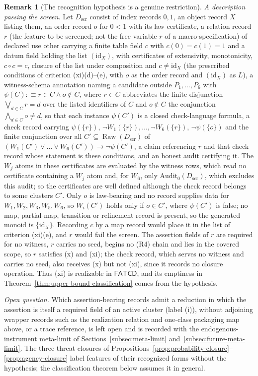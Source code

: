 \documentclass[11pt]{article}
\theoremstyle{definition}
\newtheorem{remark}[theorem]{Remark}
\newcommand{\FATCD}{\ensuremath{\mathsf{FATCD}}}
\newcommand{\Raw}[1]{\ensuremath{\operatorname{Raw}\!\left(#1\right)}}
\begin{document}
\begin{remark}[The recognition hypothesis is a genuine restriction]
\emph{A description passing the screen.} Let \(D_{\mathrm{scr}}\) consist of
index records \(0,1\), an object record \(X\) listing them, an order record \(o\) for
\(0<1\) with its law certificate, a relation record \(r\) (the feature to be screened; not the free variable \(r\) of a macro-specification) of declared use
other carrying a finite table field \(c\) with \(c(0)=c(1)=1\) and a datum field
holding the list \((\mathrm{id}_X)\), with
certificates of extensivity, monotonicity, \(c\circ c=c\), closure of the list
under composition and \(c\ne\mathrm{id}_X\) (the prescribed conditions of criterion (xi)(d)--(e), with \(o\) as the order record and \((\mathrm{id}_X)\) as \(L\)), a witness-schema annotation naming a
candidate outside \(P_1,\dots,P_6\) with \(\psi(C):\equiv r\in C\wedge o\notin
C\), where \(r\in C\) abbreviates the finite disjunction \(\bigvee_{d\in C}r=d\)
over the listed identifiers of \(C\) and \(o\notin C\) the conjunction
\(\bigwedge_{d\in C}o\neq d\), so that each instance \(\psi(C')\) is a closed
check-language formula, a check record carrying \(\psi(\{r\})\), \(\neg W_1(\{r\}),\dots,\neg
W_6(\{r\})\), \(\neg\psi(\{o\})\) and the finite conjunction over all
\(C'\subseteq\Raw{D_{\mathrm{scr}}}\) of \((W_1(C')\vee\dots\vee
W_6(C'))\rightarrow\neg\psi(C')\), a claim referencing \(r\) and that check
record whose statement is these conditions, and an honest audit certifying
it. The \(W_j\) atoms in these certificates are evaluated by the witness rows,
which read no certificate containing a \(W_j\) atom and, for \(W_6\), only
\(\mathrm{Audit}_0(D_{\mathrm{scr}})\), which excludes this audit; so the
certificates are well defined although the check record belongs to some
clusters \(C'\). Only \(o\) is law-bearing and no record supplies data for
\(W_1,W_2,W_3,W_5,W_6\), so \(W_i(C')\) holds only if \(o\in C'\), where
\(\psi(C')\) is false; no map, partial-map, transition or refinement record is
present, so the generated monoid is \(\{\mathrm{id}_X\}\). Recording \(c\) by
a map record would place it in the list of criterion (xi)(e), and \(r\) would
fail the screen. The assertion fields
of \(r\) are required for no witness, \(r\) carries no seed, begins no (R4)
chain and lies in the covered scope, so \(r\) satisfies (x) and (xi); the check record, which serves no witness and carries no seed, also receives (x) but not (xi), since it records no closure operation. Thus
(xi) is realizable in \FATCD{}, and its emptiness in
Theorem~\ref{thm:upper-bound-classification} comes from the hypothesis.

\emph{Open question.} Which assertion-bearing records admit a reduction in which the assertion is
itself a required field of an active cluster (label (i)), without
adjoining wrapper records such as the realization relation and one-class
packaging map above, or a trace reference, is left open and is
recorded with the endogenous-instrument meta-limit of
Sections~\ref{subsec:meta-limit} and~\ref{subsec:future-meta-limit}. The three
threat closures of
Propositions~\ref{prop:probability-closure}--\ref{prop:agency-closure} label
features of their recognized forms without the hypothesis; the classification
theorem below assumes it in general.
\end{remark}
\end{document}
